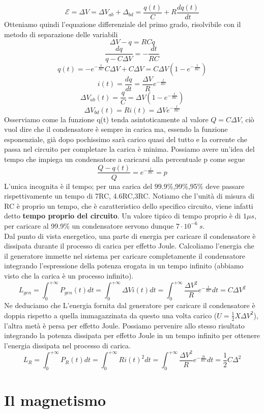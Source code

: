 \documentclass[10pt,a4paper]{article}
\begin{document}
\[\mathcal{E} = \Delta V = \Delta V_{ab} + \Delta_{bd} = \frac{q(t)}{C}+R\frac{dq(t)}{dt}\]
Otteniamo quindi l'equazione differenziale del primo grado, risolvibile con il metodo di separazione delle variabili
\[\Delta V-q = RC \dot{q}\]
\[\frac{dq}{q-C\Delta V}= -\frac{dt}{RC}\]
\[q(t) = -e^{-\frac{t}{RC}}C\Delta V+C\Delta V = C\Delta V(1-e^{-\frac{t}{RC}})\]
\[i(t) = \frac{dq}{dt} = \frac{\Delta V}{R}e^{-\frac{t}{RC}}\]
\[\Delta V_{ab}(t)=\frac{q}{C}= \Delta V(1-e^{-\frac{t}{RC}})\]
\[\Delta V_{bd}(t)=Ri(t)= \Delta Ve^{-\frac{t}{RC}}\]
Osserviamo come la funzione q(t) tenda asintoticamente al valore \(Q=C\Delta V \), ciò vuol dire che il condensatore è sempre in carica ma, essendo la funzione esponenziale, già dopo pochissimo sarà carico quasi del tutto e la corrente che passa nel circuito per completare la carica è minima. Possiamo avere un'idea del tempo che impiega un condensatore a caricarsi alla percentuale p come segue
\[\frac{Q-q(t)}{Q} = e^{-\frac{t}{RC}}=p\]
L'unica incognita è il tempo; per una carica del 99.9\%,99\%,95\% deve passare rispettivamente un tempo di 7RC, 4.6RC,3RC. Notiamo che l'unità di misura di RC è proprio un tempo, che è caratteristico dello specifico circuito, viene infatti detto \textbf{tempo proprio del circuito}. Un valore tipico di tempo proprio è di \(1\mu s \), per caricare al 99.9\% un condensatore servono dunque \(7\cdot10^{-6}\ s\). \\
Dal punto di vista energetico, una parte di energia per caricare il condensatore è dissipata durante il processo di carica per effetto Joule. Calcoliamo l'energia che il generatore immette nel sistema per caricare completamente il condensatore integrando l'espressione della potenza erogata in un tempo infinito (abbiamo visto che la carica è un processo infinito). 
\[L_{gen} = \int_{0}^{+\infty}P_{gen}(t)dt=\int_{0}^{+\infty}\Delta V i(t)dt = \int_{0}^{+\infty}\frac{\Delta V^2}{R} e^{-\frac{t}{RC}}dt = C\Delta V^2 \]
Ne deduciamo che L'energia fornita dal generatore per caricare il condensatore è doppia rispetto a quella immagazzinata da questo una volta carico (\(U=\frac{1}{2}X\Delta V^2\)), l'altra metà è persa per effetto Joule. Possiamo pervenire allo stesso risultato integrando la potenza dissipata per effetto Joule in un tempo infinito per ottenere l'energia dissipata nel processo di carica. 
\[L_{R} = \int_{0}^{+\infty}P_{R}(t)dt =\int_{0}^{+\infty}Ri(t)^2dt = \int_{0}^{+\infty}\frac{\Delta V^2}{R}e^{-\frac{2t}{RC}}dt = \frac{1}{2}C\Delta^2\]
\section{Il magnetismo}
\end{document}
